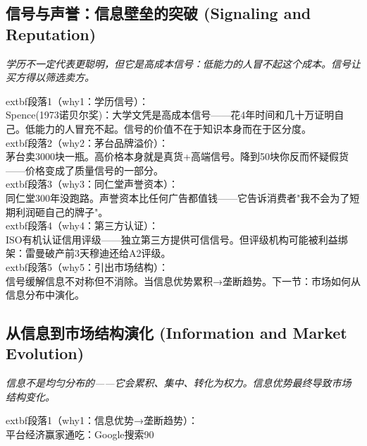 \documentclass[openany, a4paper, 12pt]{book}
\newenvironment{motivation}{
	\vspace{0.5em}
	\begin{tcolorbox}[
		colback=gray!10,           %
		colframe=gray!60,          %
		title=\textit{本章动机 (Motivation)},
		fonttitle=\bfseries,
		arc=0mm,                   %
		leftrule=3mm               %
		]
		\small \itshape %
	}{
	\end{tcolorbox}
	\vspace{1em}
}
\begin{document}
	\subsection{信号与声誉：信息壁垒的突破 (Signaling and Reputation)}
	\begin{motivation}学历不一定代表更聪明，但它是高成本信号：低能力的人冒不起这个成本。信号让买方得以筛选卖方。\end{motivation}
		extbf{段落1（why1：学历信号）}：\\Spence(1973诺贝尔奖)：大学文凭是高成本信号——花4年时间和几十万证明自己。低能力的人冒充不起。信号的价值不在于知识本身而在于区分度。\\	extbf{段落2（why2：茅台品牌溢价）}：\\茅台卖3000块一瓶。高价格本身就是真货+高端信号。降到50块你反而怀疑假货——价格变成了质量信号的一部分。\\	extbf{段落3（why3：同仁堂声誉资本）}：\\同仁堂300年没跑路。声誉资本比任何广告都值钱——它告诉消费者"我不会为了短期利润砸自己的牌子"。\\	extbf{段落4（why4：第三方认证）}：\\ISO有机认证信用评级——独立第三方提供可信信号。但评级机构可能被利益绑架：雷曼破产前3天穆迪还给A2评级。\\	extbf{段落5（why5：引出市场结构）}：\\信号缓解信息不对称但不消除。当信息优势累积→垄断趋势。下一节：市场如何从信息分布中演化。

	\subsection{从信息到市场结构演化 (Information and Market Evolution)}
	\begin{motivation}信息不是均匀分布的——它会累积、集中、转化为权力。信息优势最终导致市场结构变化。\end{motivation}
		extbf{段落1（why1：信息优势→垄断趋势）}：\\平台经济赢家通吃：Google搜索90%
\end{document}

